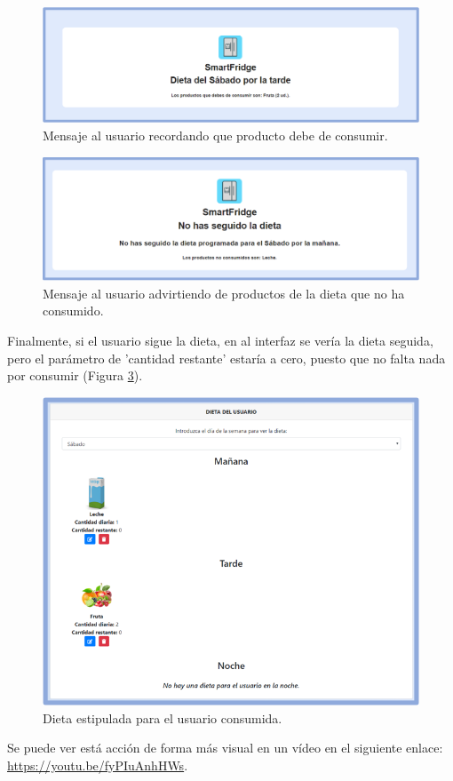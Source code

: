 \begin{figure}[h] 
    \centering
    \includegraphics[width=.80\textwidth]{capitulos/capitulo10/dieta/2.png}
    \caption{Mensaje al usuario recordando que producto debe de consumir.}
    \label{fig:d2}
\end{figure}

\begin{figure}[h] 
    \centering
    \includegraphics[width=.80\textwidth]{capitulos/capitulo10/dieta/3.png}
    \caption{Mensaje al usuario advirtiendo de productos de la dieta que no ha consumido.}
    \label{fig:d3}
\end{figure}

Finalmente, si el usuario sigue la dieta, en al interfaz se vería la dieta seguida, pero el parámetro de 'cantidad restante' estaría a cero, puesto que no falta nada por consumir (Figura \ref{fig:d4}).

\begin{figure}[!t] 
    \centering
    \includegraphics[width=.60\textwidth]{capitulos/capitulo10/dieta/4.png}
    \caption{Dieta estipulada para el usuario consumida.}
    \label{fig:d4}
\end{figure}

\newpage
Se puede ver está acción de forma más visual en un vídeo en el siguiente enlace: \url{https://youtu.be/fyPIuAnhHWs}.